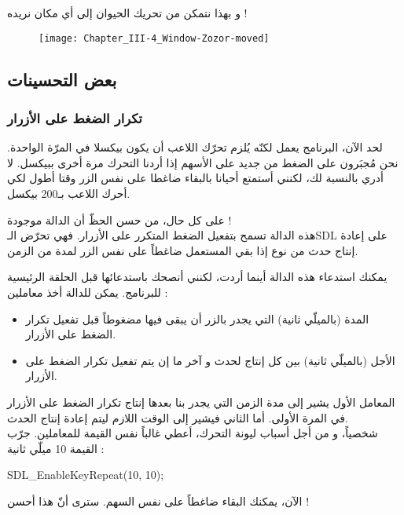و بهذا نتمكن من تحريك الحيوان إلى أي مكان نريده !

\begin{figure}[H]
	\centering
	\texttt{[image: Chapter\_III-4\_Window-Zozor-moved]}
\end{figure}

\subsection{بعض التحسينات}

\subsubsection{تكرار الضغط على الأزرار}

لحد الآن، البرنامج يعمل لكنّه يُلزم تحرّك اللاعب أن يكون بيكسلا في المرّة الواحدة. نحن مُجبَرون على الضغط من جديد على الأسهم إذا أردنا التحرك مرة أخرى ببيكسل. لا أدري بالنسبة لك، لكنني أستمتع أحيانا بالبقاء ضاغطا على نفس الزر وقتا أطول لكي أحرك اللاعب بـ200 بيكسل.

على كل حال، من حسن الحظّ أن الدالة 
موجودة !\\
هذه الدالة تسمح بتفعيل الضغط المتكرر على الأزرار. فهي تحرّض الـ\textenglish{SDL}
على إعادة إنتاج حدث من نوع
إذا بقي المستعمل ضاغطاً على نفس الزر لمدة من الزمن.

يمكنك استدعاء هذه الدالة أينما أردت، لكنني أنصحك باستدعائها قبل الحلقة الرئيسية للبرنامج. يمكن للدالة أخذ معاملين :

\begin{itemize}
	\item المدة (بالميلّي ثانية) التي يجدر بالزر أن يبقى فيها مضغوطاً قبل تفعيل تكرار الضغط على الأزرار.
	\item الأجل (بالميلّي ثانية) بين كل إنتاج لحدث
	و آخر ما إن يتم تفعيل تكرار الضغط على الأزرار.
\end{itemize}

المعامل الأول يشير إلى مدة الزمن التي يجدر بنا بعدها إنتاج تكرار الضغط على الأزرار في المرة الأولى. أما الثاني فيشير إلى الوقت اللازم ليتم إعادة إنتاج الحدث.\\
شخصياً، و من أجل أسباب ليونة التحرك، أعطي غالباً نفس القيمة للمعاملين. جرّب القيمة 10 ميلّي ثانية :

\begin{Csource}
SDL_EnableKeyRepeat(10, 10);
\end{Csource}

الآن، يمكنك البقاء ضاغطاً على نفس السهم. سترى أنّ هذا أحسن !

